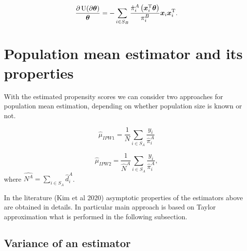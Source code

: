 \documentclass[
  letterpaper,
  DIV=11,
  numbers=noendperiod]{scrreprt}
\begin{document}
\[
    \frac{\partial \operatorname{U}(\partial \boldsymbol{\theta})}{\boldsymbol{\theta}} = - \sum_{i \in S_B} \frac{\dot{\pi}_i^A\left(\boldsymbol{x}_i^{\mathrm{T}} \boldsymbol{\theta} \right)}{\pi_i^B} \boldsymbol{x}_i \boldsymbol{x}_i^{\mathrm{T}}.
\]

\section{Population mean estimator and its
properties}\label{population-mean-estimator-and-its-properties}

With the estimated propensity scores we can consider two approaches for
population mean estimation, depending on whether population size is
known or not.

\[
\begin{equation*}
    \hat{\mu}_{IPW1} = \frac{1}{N} \sum_{i \in S_A} \frac{y_i}{\hat{\pi}_i^{A}}
\end{equation*}
\]

\[
\begin{equation*}
    \hat{\mu}_{IPW2} = \frac{1}{\hat{N}^{A}} \sum_{i \in S_A} \frac{y_i}{\hat{\pi}_i^{A}},
\end{equation*}
\] where \(\hat{N^A} = \sum_{i \in S_A} \hat{d}_i^A\).

In the literature (Kim et al 2020) asymptotic properties of the
estimators above are obtained in details. In particular main approach is
based on Taylor approximation what is performed in the following
subsection.

\subsection{Variance of an estimator}\label{variance-of-an-estimator}
\end{document}
